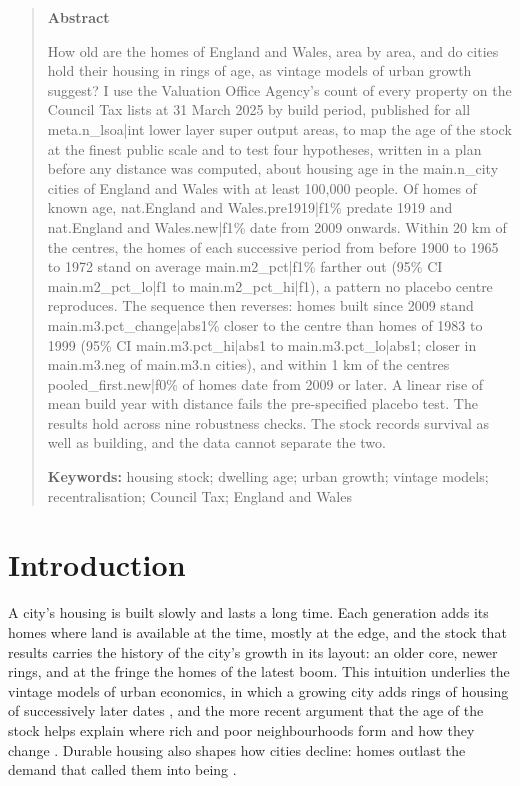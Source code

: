 \begin{quote}
\small
\begin{center}\textbf{Abstract}\end{center}
How old are the homes of England and Wales, area by area, and do cities hold their housing in rings of age, as vintage models of urban growth suggest? I use the Valuation Office Agency's count of every property on the Council Tax lists at 31 March 2025 by build period, published for all {{meta.n_lsoa|int}} lower layer super output areas, to map the age of the stock at the finest public scale and to test four hypotheses, written in a plan before any distance was computed, about housing age in the {{main.n_city}} cities of England and Wales with at least 100,000 people. Of homes of known age, {{nat.England and Wales.pre1919|f1}}\% predate 1919 and {{nat.England and Wales.new|f1}}\% date from 2009 onwards. Within 20 km of the centres, the homes of each successive period from before 1900 to 1965 to 1972 stand on average {{main.m2_pct|f1}}\% farther out (95\% CI {{main.m2_pct_lo|f1}} to {{main.m2_pct_hi|f1}}), a pattern no placebo centre reproduces. The sequence then reverses: homes built since 2009 stand {{main.m3.pct_change|abs1}}\% closer to the centre than homes of 1983 to 1999 (95\% CI {{main.m3.pct_hi|abs1}} to {{main.m3.pct_lo|abs1}}; closer in {{main.m3.neg}} of {{main.m3.n}} cities), and within 1 km of the centres {{pooled_first.new|f0}}\% of homes date from 2009 or later. A linear rise of mean build year with distance fails the pre-specified placebo test. The results hold across nine robustness checks. The stock records survival as well as building, and the data cannot separate the two.

\textbf{Keywords:} housing stock; dwelling age; urban growth; vintage models; recentralisation; Council Tax; England and Wales
\end{quote}

\section{Introduction}
\label{sec:intro}
A city's housing is built slowly and lasts a long time. Each generation adds its homes where land is available at the time, mostly at the edge, and the stock that results carries the history of the city's growth in its layout: an older core, newer rings, and at the fringe the homes of the latest boom. This intuition underlies the vintage models of urban economics, in which a growing city adds rings of housing of successively later dates \citep{harrison1974,brueckner1980,wheaton1982,braid2001}, and the more recent argument that the age of the stock helps explain where rich and poor neighbourhoods form and how they change \citep{rosenthal2008,brueckner2009,rosenthal2015}. Durable housing also shapes how cities decline: homes outlast the demand that called them into being \citep{glaeser2005}.

